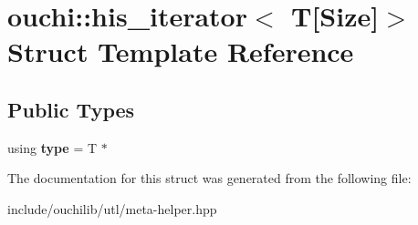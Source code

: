 \hypertarget{structouchi_1_1his__iterator_3_01_t[_size]_4}{}\section{ouchi\+::his\+\_\+iterator$<$ T\mbox{[}Size\mbox{]}$>$ Struct Template Reference}
\label{structouchi_1_1his__iterator_3_01_t[_size]_4}
\subsection*{Public Types}
\begin{DoxyCompactItemize}
\item 
\mbox{\label{structouchi_1_1his__iterator_3_01_t[_size]_4_a2057dc0a33a98af9f8430948df5b3aa7}} 
using {\bfseries type} = T $\ast$
\end{DoxyCompactItemize}


The documentation for this struct was generated from the following file\+:\begin{DoxyCompactItemize}
\item 
include/ouchilib/utl/meta-\/helper.\+hpp\end{DoxyCompactItemize}
